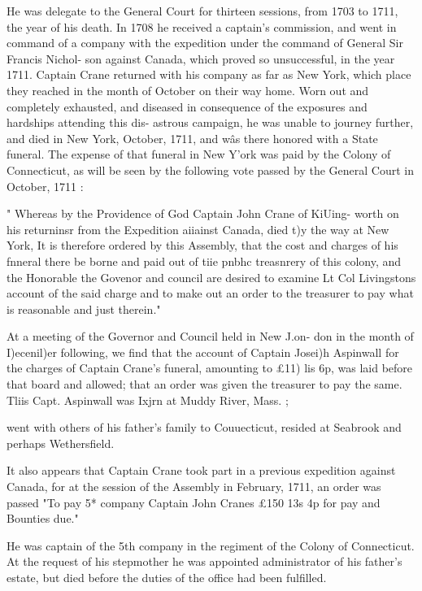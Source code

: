 \documentclass{book}
\begin{document}
He was delegate to the General Court for thirteen sessions, 
from 1703 to 1711, the year of his death. In 1708 he received a 
captain's commission, and went in command of a company with 
the expedition under the command of General Sir Francis Nichol- 
son against Canada, which proved so unsuccessful, in the year 
1711. Captain Crane returned with his company as far as New 
York, which place they reached in the month of October on their 
way home. Worn out and completely exhausted, and diseased 
in consequence of the exposures and hardships attending this dis- 
astrous campaign, he was unable to journey further, and died in 
New York, October, 1711, and w\^as there honored with a State 
funeral. The expense of that funeral in New Y'ork was paid by 
the Colony of Connecticut, as will be seen by the following vote 
passed by the General Court in October, 1711 : 

" Whereas by the Providence of God Captain John Crane of KiUing- 
worth on his returninsr from the Expedition aiiainst Canada, died t)y the 
way at New York, It is therefore ordered by this Assembly, that the 
cost and charges of his fnneral there be borne and paid out of tiie pnbhc 
treasnrery of this colony, and the Honorable the Govenor and council 
are desired to examine Lt Col Livingstons account of the said charge 
and to make out an order to the treasurer to pay what is reasonable and 
just therein." 

At a meeting of the Governor and Council held in New J.on- 
don in the month of I)ecenil)er following, we find that the account 
of Captain Josei)h Aspinwall for the charges of Captain Crane's 
funeral, amounting to £11)  lis  6p, was laid before that board 
and allowed; that an order was given the treasurer to pay the 
same. Tliis Capt. Aspinwall was Ixjrn at Muddy River, Mass. ; 




went with others of his father's family to Couuecticut, resided at 
Seabrook and perhaps Wethersfield. 

It also appears that Captain Crane took part in a previous 
expedition against Canada, for at the session of the Assembly in 
February, 1711, an order was passed "To pay 5* company 
Captain John Cranes £150  13s  4p for pay and Bounties due." 

He was captain of the 5th company in the regiment of the 
Colony of Connecticut. At the request of his stepmother he was 
appointed administrator of his father's estate, but died before the 
duties of the office had been fulfilled. 
\end{document}
